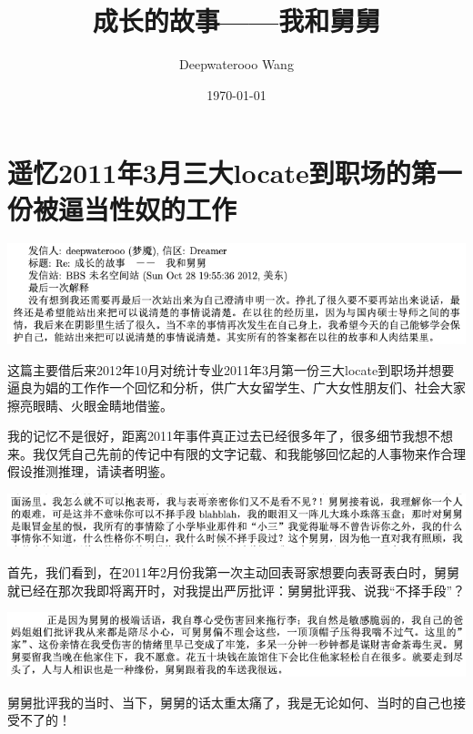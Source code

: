 \documentclass[9pt, b5paper]{article}
\author{Deepwaterooo Wang}
\date{\today}
\title{成长的故事——我和舅舅}
\begin{document}
\maketitle
\tableofcontents


\section{遥忆2011年3月三大locate到职场的第一份被逼当性奴的工作}
\label{sec:org77b90fb}

\begin{center}
\includegraphics[width=.9\linewidth]{./pic/backups_plans_p1p143-1.png.png}
\end{center}

这篇主要借后来2012年10月对统计专业2011年3月第一份三大locate到职场并想要逼良为娼的工作作一个回忆和分析，供广大女留学生、广大女性朋友们、社会大家擦亮眼睛、火眼金睛地借鉴。

我的记忆不是很好，距离2011年事件真正过去已经很多年了，很多细节我想不想来。我仅凭自己先前的传记中有限的文字记载、和我能够回忆起的人事物来作合理假设推测推理，请读者明鉴。

\begin{center}
\includegraphics[width=.9\linewidth]{./pic/backups_plans_20210412_103658.png}
\end{center}

首先，我们看到，在2011年2月份我第一次主动回表哥家想要向表哥表白时，舅舅就已经在那次我即将离开时，对我提出严厉批评：舅舅批评我、说我“不择手段”？

\begin{center}
\includegraphics[width=.9\linewidth]{./pic/backups_plans_20210412_110028.png}
\end{center}
舅舅批评我的当时、当下，舅舅的话太重太痛了，我是无论如何、当时的自己也接受不了的！
\end{document}
